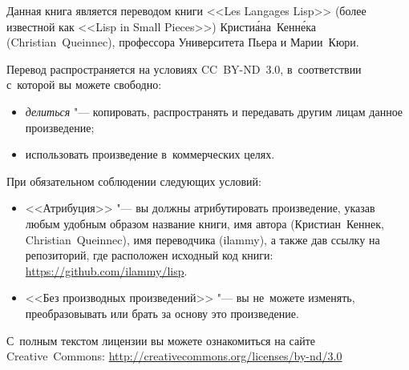 \begingroup
\thispagestyle{empty}
\setlength{\parindent}{0pt}
\small

Данная книга является переводом книги <<Les Langages Lisp>> (более известной
как <<Lisp in Small Pieces>>) Кристи\'{а}на~Кенн\'{е}ка (Christian~Queinnec),
профессора Университета Пьера и Марии~Кюри.

\bigskip

Перевод распространяется на условиях \textsf{CC~BY-ND~3.0}, в~соответствии
с~которой вы можете свободно:

\begin{itemize}
  \item \emph{делиться} "--- копировать, распространять и передавать другим
        лицам данное произведение;

  \item использовать произведение в~коммерческих целях.
\end{itemize}

\noindent
При обязательном соблюдении следующих условий:

\begin{itemize}
  \item <<Атрибуция>> "--- вы должны атрибутировать произведение, указав любым
        удобным образом название книги, имя автора (Кристиан~Кеннек,
        Christian~Queinnec), имя переводчика (ilammy), а также дав ссылку
        на репозиторий, где расположен исходный код книги:
        \url{https://github.com/ilammy/lisp}.

  \item <<Без производных произведений>> "--- вы не~можете изменять,
        преобразовывать или брать за основу это произведение.
\end{itemize}

С~полным текстом лицензии вы можете ознакомиться на сайте Creative~Commons:
\url{http://creativecommons.org/licenses/by-nd/3.0}

\endgroup

\clearpage
